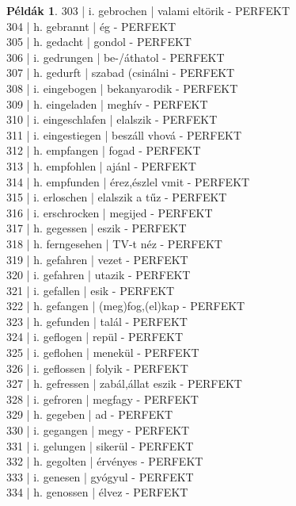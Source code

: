 \documentclass{article}
\theoremstyle{definition}
\newtheorem*{exmp}{Példák}
\begin{document}
\begin{exmp}
303 | i. gebrochen | valami eltörik - PERFEKT\\
304 | h. gebrannt | ég - PERFEKT\\
305 | h. gedacht | gondol - PERFEKT\\
306 | i. gedrungen | be-/áthatol - PERFEKT\\
307 | h. gedurft | szabad (csinálni - PERFEKT\\
308 | i. eingebogen | bekanyarodik - PERFEKT\\
309 | h. eingeladen | meghív - PERFEKT\\
310 | i. eingeschlafen | elalszik - PERFEKT\\
311 | i. eingestiegen | beszáll vhová - PERFEKT\\
312 | h. empfangen | fogad - PERFEKT\\
313 | h. empfohlen | ajánl - PERFEKT\\
314 | h. empfunden | érez,észlel vmit - PERFEKT\\
315 | i. erloschen | elalszik a tűz - PERFEKT\\
316 | i. erschrocken | megijed - PERFEKT\\
317 | h. gegessen | eszik - PERFEKT\\
318 | h. ferngesehen | TV-t néz - PERFEKT\\
319 | h. gefahren | vezet - PERFEKT\\
320 | i. gefahren | utazik - PERFEKT\\
321 | i. gefallen | esik - PERFEKT\\
322 | h. gefangen | (meg)fog,(el)kap - PERFEKT\\
323 | h. gefunden | talál - PERFEKT\\
324 | i. geflogen | repül - PERFEKT\\
325 | i. geflohen | menekül - PERFEKT\\
326 | i. geflossen | folyik - PERFEKT\\
327 | h. gefressen | zabál,állat eszik - PERFEKT\\
328 | i. gefroren | megfagy - PERFEKT\\
329 | h. gegeben | ad - PERFEKT\\
330 | i. gegangen | megy - PERFEKT\\
331 | i. gelungen | sikerül - PERFEKT\\
332 | h. gegolten | érvényes - PERFEKT\\
333 | i. genesen | gyógyul - PERFEKT\\
334 | h. genossen | élvez - PERFEKT\\

\end{exmp}
\end{document}
